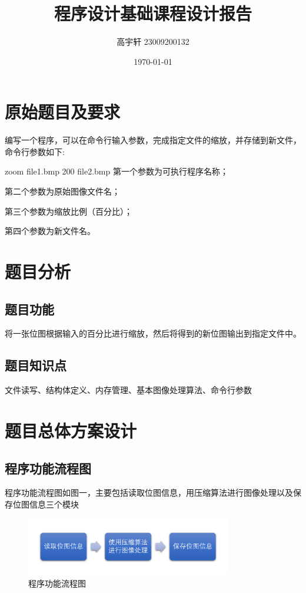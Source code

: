 \documentclass{ctexart}
\title{\vspace{-2cm}\textbf{程序设计基础课程设计报告} \\ \fontsize{12}{14}{---位图图像文件缩放}}
\author{高宇轩 23009200132}
\date{\today}
\begin{document}
    
    \maketitle
    
    \section{原始题目及要求}
    编写一个程序，可以在命令行输入参数，完成指定文件的缩放，并存储到新文件，命令行参数如下:
    
    zoom file1.bmp 200 file2.bmp
    第一个参数为可执行程序名称；
    
    第二个参数为原始图像文件名；
    
    第三个参数为缩放比例（百分比）；
    
    第四个参数为新文件名。
    
    
    \section{题目分析}
    
    \subsection{题目功能}
    将一张位图根据输入的百分比进行缩放，然后将得到的新位图输出到指定文件中。
    
    \subsection{题目知识点}
    文件读写、结构体定义、内存管理、基本图像处理算法、命令行参数
    
    \section{题目总体方案设计}
    
    \subsection{程序功能流程图}
    
    程序功能流程图如图一，主要包括读取位图信息，用压缩算法进行图像处理以及保存位图信息三个模块

    \begin{figure}[h] %
        \centering
        \includegraphics[width=0.8\textwidth]{flow.png}
        \caption{程序功能流程图}  
    \end{figure}
\end{document}
